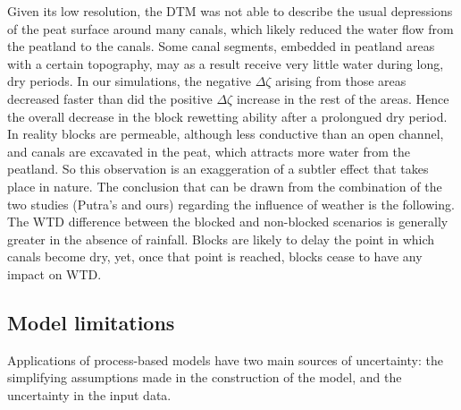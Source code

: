 \documentclass[bg, manuscript]{copernicus}
\begin{document}
Given its low resolution, the DTM was not able to describe the usual depressions of the peat surface around many canals, which likely reduced the water flow from the peatland to the canals.
Some canal segments, embedded in peatland areas with a certain topography, may as a result receive very little water during long, dry periods.
In our simulations, the negative $\Delta \zeta$ arising from those areas decreased faster than did the positive $\Delta \zeta$ increase in the rest of the areas.
Hence the overall decrease in the block rewetting ability after a prolongued dry period.
In reality blocks are permeable, although less conductive than an open channel, and canals are excavated in the peat, which attracts more water from the peatland.
So this observation is an exaggeration of a subtler effect that takes place in nature.
The conclusion that can be drawn from the combination of the two studies (Putra's and ours) regarding the influence of weather is the following.
The WTD difference between the blocked and non-blocked scenarios is generally greater in the absence of rainfall.
Blocks are likely to delay the point in which canals become dry, yet, once that point is reached, blocks cease to have any impact on WTD.


\subsection{Model limitations}

Applications of process-based models have two main sources of uncertainty: the simplifying assumptions made in the construction of the model, and the uncertainty in the input data.
\end{document}
